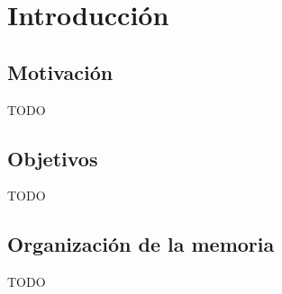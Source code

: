\chapter{Introducción\label{CAP:INTRODUCCION}}
  \section{Motivación\label{SEC:MOTIVACION}}
    TODO
  \section{Objetivos\label{SEC:OBJETIVOS}}
    TODO
    \begin{comment}
    \paragraph{Objetive con anidación}
    
    Se utiliza para definir objetivos.
    
    \begin{objetive}
    \item Un ejemplo anidado.
    \begin{objetive}
    \item Este es el primer punto anidado.
    \item Y este el segundo.
    \end{objetive}
    \item Se sale de la anidación.
    \end{objetive}
    \end{comment}
  \section{Organización de la memoria\label{SEC:ORGANIZACION}}
    TODO